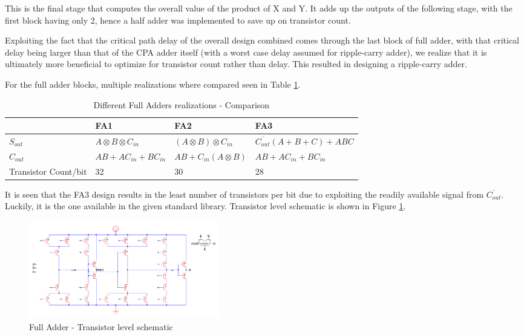 \documentclass[journal]{IEEEtran}
\begin{document}
This is the final stage that computes the overall value of the product of X and Y. It adds up the outputs of the following stage, with the first block having only 2, hence a half adder was implemented to save up on transistor count.

Exploiting the fact that the critical path delay of the overall design combined comes through the last block of full adder, with that critical delay being larger than that of the CPA adder itself (with a worst case delay assumed for ripple-carry adder), we realize that it is ultimately more beneficial to optimize for transistor count rather than delay. This resulted in designing a ripple-carry adder.

For the full adder blocks, multiple realizations where compared seen in Table 
\ref{tab:t5}.


\begin{table}[!h]
\renewcommand{\arraystretch}{1.2}
\caption{Different Full Adders realizations - Comparison}
\label{tab:t5}
\centering
\begin{tabular}{| p{1cm} | p{2cm} | p{2cm} | p{2cm} |}
\hline
~~ & \textbf{FA1} & \textbf{FA2} & \textbf{FA3}\\\hline
$S_{out}$ & $A\otimes B\otimes C_{in}$ & $(A\otimes B) \otimes C_{in} $ & 
$\overline{C_{out}}(A+B+C)+ ABC$\\\hline
$C_{out}$ & $AB + A C_{in} + B C_{in}$ & $AB + C_{in}  (A\otimes B) $ & $AB + A C_{in} + B C_{in}$\\\hline
Transistor Count/bit & 32 & 30 & 28\\\hline
\end{tabular}
\end{table}


It is seen that the FA3 design results in the least number of transistors per bit due to exploiting the readily available signal from $\overline{C_{out}}$. Luckily, it is the one available in the given standard library. Transistor level schematic is shown in Figure \ref{fig:8}.

\vspace{-10pt}

\begin{figure}[h!]
  \centering
  \includegraphics[width=0.4\textwidth]{8.png}
  \centering
  \caption{Full Adder - Transistor level schematic}
  \label{fig:8}
\end{figure}
\end{document}
